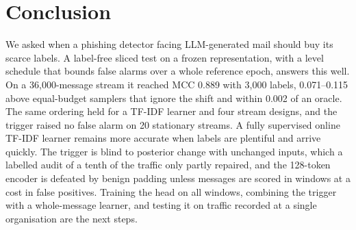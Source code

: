 \section{Conclusion}\label{sec:conclusion}
We asked when a phishing detector facing LLM-generated mail should buy its scarce labels. A label-free sliced test on a frozen representation, with a level schedule that bounds false alarms over a whole reference epoch, answers this well. On a 36{,}000-message stream it reached MCC 0.889 with 3{,}000 labels, 0.071--0.115 above equal-budget samplers that ignore the shift and within 0.002 of an oracle. The same ordering held for a TF-IDF learner and four stream designs, and the trigger raised no false alarm on 20 stationary streams. A fully supervised online TF-IDF learner remains more accurate when labels are plentiful and arrive quickly. The trigger is blind to posterior change with unchanged inputs, which a labelled audit of a tenth of the traffic only partly repaired, and the 128-token encoder is defeated by benign padding unless messages are scored in windows at a cost in false positives. Training the head on all windows, combining the trigger with a whole-message learner, and testing it on traffic recorded at a single organisation are the next steps.
